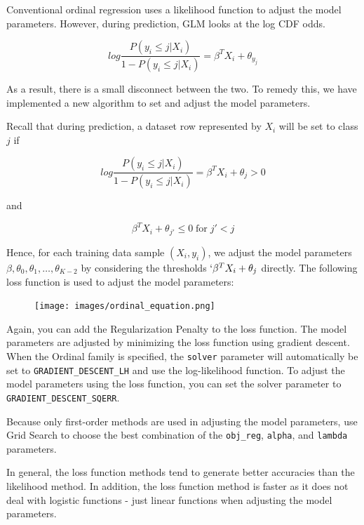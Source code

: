 Conventional ordinal regression uses a likelihood function to adjust the model parameters. However, during prediction, GLM looks at the log CDF odds. 

$$log \frac {P(y_i \leq j|X_i)} {1 - P(y_i \leq j|X_i)} = \beta^{T}X_i + \theta_{y_j}$$

As a result, there is a small disconnect between the two. To remedy this, we have implemented a new algorithm to set and adjust the model parameters. 

Recall that during prediction, a dataset row represented by $X_i$ will be set to class $j$ if 

$$log \frac {P(y_i \leq j|X_i)} {1 - P(y_i \leq j|X_i)} = \beta^{T}X_i + \theta_{j} > 0 $$

and

$$\beta^{T}X_i + \theta_{j'} \leq 0 \; \text{for} \; j' < j$$

Hence, for each training data sample $(X_{i}, y_i)$, we adjust the model parameters $\beta, \theta_0, \theta_1, \ldots, \theta_{K-2}$ by considering the thresholds $`\beta^{T}X_i + \theta_j$ directly. The following loss function is used to adjust the model parameters:

\begin{figure}[h]
\centering
\texttt{[image: images/ordinal\_equation.png]}
\end{figure}

Again, you can add the Regularization Penalty to the loss function. The model parameters are adjusted by minimizing the loss function using gradient descent. When the Ordinal family is specified, the \texttt{solver} parameter will automatically be set to \texttt{GRADIENT\_DESCENT\_LH} and use the log-likelihood function. To adjust the model parameters using the loss function, you can set the solver parameter to \texttt{GRADIENT\_DESCENT\_SQERR}. 

Because only first-order methods are used in adjusting the model parameters, use Grid Search to choose the best combination of the \texttt{obj\_reg}, \texttt{alpha}, and \texttt{lambda} parameters.

In general, the loss function methods tend to generate better accuracies than the likelihood method. In addition, the loss function method is faster as it does not deal with logistic functions - just linear functions when adjusting the model parameters.

\waterExampleInR


